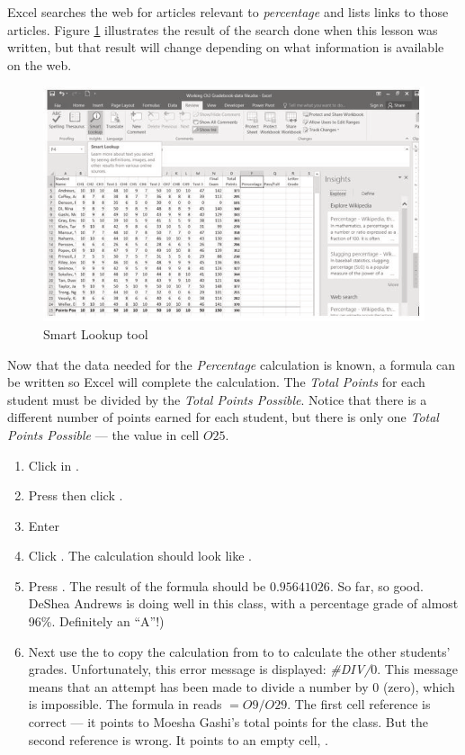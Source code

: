 Excel searches the web for articles relevant to \textit{percentage} and lists links to those articles. Figure \ref{03:fig06} illustrates the result of the search done when this lesson was written, but that result will change depending on what information is available on the web.

\begin{figure}[H]
	\centering
	\includegraphics[width=\maxwidth{.95\linewidth}]{gfx/ch03_fig06}
	\caption{Smart Lookup tool}
	\label{03:fig06}
\end{figure}

Now that the data needed for the \textit{Percentage} calculation is known, a formula can be written so Excel will complete the calculation. The \textit{Total Points} for each student must be divided by the \textit{Total Points Possible}. Notice that there is a different number of points earned for each student, but there is only one \textit{Total Points Possible} --- the value in cell $ O25 $.

\begin{enumerate}
	\item Click in .
	\item Press \fmtTyping{=} then click . 
	\item Enter \fmtTyping{/}
	\item Click . The calculation should look like .
	\item Press . The result of the formula should be $ 0.95641026 $. So far, so good. DeShea Andrews is doing well in this class, with a percentage grade of almost 96\%. Definitely an ``A''!)
	\item Next use the  to copy the calculation from  to  to calculate the other students' grades. Unfortunately, this error message is displayed: \textit{\#DIV/$ 0 $}. This message means that an attempt has been made to divide a number by $ 0 $ (zero), which is impossible. The formula in  reads $ =O9/O29 $. The first cell reference is correct --- it points to Moesha Gashi's total points for the class. But the second reference is wrong. It points to an empty cell, .

\end{enumerate}

